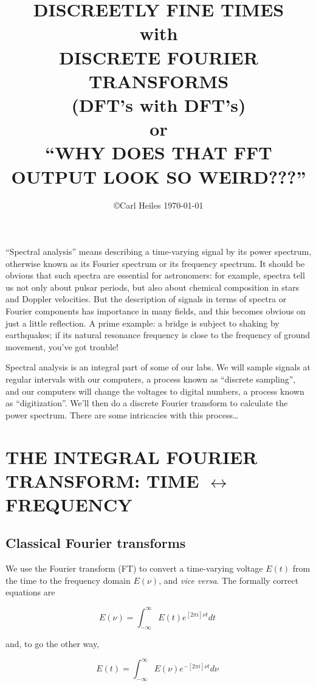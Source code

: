 \documentclass[psfig,preprint]{aastex}
\begin{document}
\setcounter{section}{-1}

\title{DISCREETLY FINE TIMES \\ with \\ DISCRETE FOURIER TRANSFORMS \\
(DFT's with DFT's) \\ or \\ ``WHY DOES THAT FFT OUTPUT LOOK SO
WEIRD???''}

\author{\copyright Carl Heiles \today }

          ``Spectral analysis'' means describing a time-varying signal
by its power spectrum, otherwise known as its Fourier spectrum or its
frequency spectrum.  It should be obvious that such spectra are essential for
astronomers: for example, spectra tell us not only about pulsar periods,
but also about chemical composition in stars and Doppler velocities. 
But the description of signals in terms of spectra or Fourier components
has importance in many fields, and this becomes obvious on just a little
reflection.  A prime example: a bridge is subject to shaking by
earthquakes; if its natural resonance frequency is close to the
frequency of ground movement, you've got trouble!

	Spectral analysis is an integral part of some of our labs.  We
will sample signals at regular intervals with our computers, a process
known as ``discrete sampling'', and our computers will change the
voltages to digital numbers, a process known as ``digitization''. We'll
then do a discrete Fourier transform to calculate the power spectrum.
There are some intricacies with this process\dots

\tableofcontents

\section{THE INTEGRAL FOURIER TRANSFORM: TIME $\leftrightarrow$ FREQUENCY}

\subsection{Classical Fourier transforms}

          We use the Fourier transform (FT) to convert a time-varying
voltage $E(t)$ from the time to the frequency domain $E(\nu)$, and {\it
vice versa}.  The formally correct equations are

\begin{mathletters} \label{eqone}
\begin{equation}
E(\nu) = \int_{-\infty}^{\infty} E(t) e^{[2 \pi i]\nu t}  dt \; 
\end{equation}

\noindent and, to go the other way, 

\begin{equation}
E(t) = \int_{-\infty}^{\infty} E(\nu) e^{-[2 \pi i]\nu t}  d\nu \; 
\end{equation}
\end{mathletters}
\end{document}
